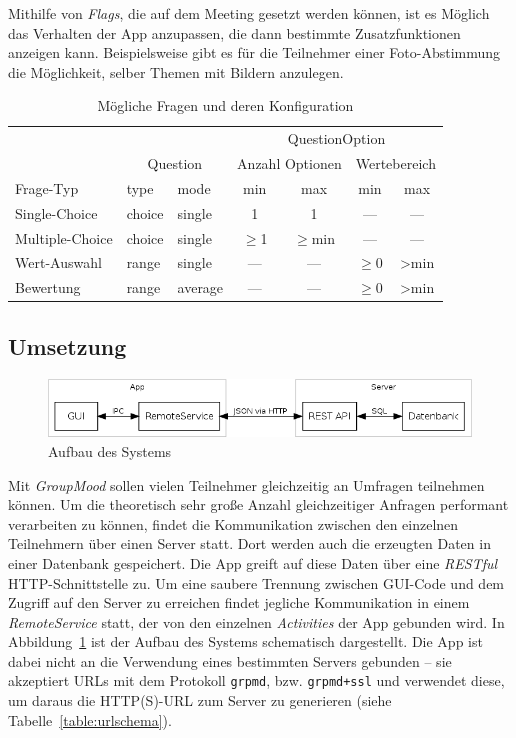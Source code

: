 Mithilfe von \emph{Flags}, die auf dem Meeting gesetzt werden können, ist es Möglich das Verhalten der App anzupassen, die dann bestimmte Zusatzfunktionen anzeigen kann. Beispielsweise gibt es für die Teilnehmer einer Foto-Abstimmung die Möglichkeit, selber Themen mit Bildern anzulegen.

\begin{table}
\begin{center}
\begin{tabular}{l l l c c c c}
& & & \multicolumn{4}{c}{QuestionOption} \\
& \multicolumn{2}{c}{Question} & \multicolumn{2}{c}{Anzahl Optionen} & \multicolumn{2}{c}{Wertebereich} \\
Frage-Typ & type & mode & min & max & min & max \\
\hline
Single-Choice & choice & single & 1 & 1 & --- & --- \\
Multiple-Choice & choice & single & $\geq$1 & $\geq$min & --- & --- \\
Wert-Auswahl & range & single & --- & --- & $\geq$0 & >min \\
Bewertung & range & average & --- & --- & $\geq$0 & >min \\
\end{tabular}
\caption{Mögliche Fragen und deren Konfiguration}
\label{table:questiontypes}
\end{center}
\end{table}

\subsection{Umsetzung}

\begin{figure}[htb]
\begin{center}
\includegraphics[width=\textwidth]{media/system.png}
\end{center}
\caption{Aufbau des Systems}
\label{f:system}
\end{figure}

Mit \emph{GroupMood} sollen vielen Teilnehmer gleichzeitig an Umfragen teilnehmen können. Um die theoretisch sehr große Anzahl gleichzeitiger Anfragen performant verarbeiten zu können, findet die Kommunikation zwischen den einzelnen Teilnehmern über einen Server statt. Dort werden auch die erzeugten Daten in einer Datenbank gespeichert. Die App greift auf diese Daten über eine \emph{RESTful} HTTP-Schnittstelle zu. Um eine saubere Trennung zwischen GUI-Code und dem Zugriff auf den Server zu erreichen findet jegliche Kommunikation in einem \emph{RemoteService} statt, der von den einzelnen \emph{Activities} der App gebunden wird. In Abbildung~\ref{f:system}  ist der Aufbau des Systems schematisch dargestellt. Die App ist dabei nicht an die Verwendung eines bestimmten Servers gebunden -- sie akzeptiert URLs mit dem Protokoll \texttt{grpmd}, bzw. \texttt{grpmd+ssl} und verwendet diese, um daraus die HTTP(S)-URL zum Server zu generieren (siehe Tabelle~\ref{table:urlschema}).

